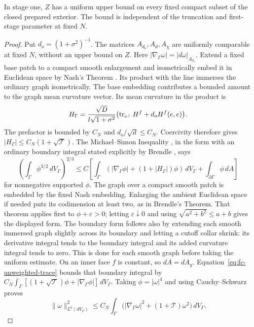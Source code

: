 \begin{lemma}
\label{lem:fc-graph-iteration}
In stage one, $Z$ has a uniform upper bound on every fixed compact
subset of the closed prepared exterior.  The bound is independent
of the truncation and first-stage parameter at fixed $N$.
\end{lemma}

\begin{proof}
Put $d_o=(1+\sigma^2)^{-1}$.  The matrices $A_{d_o},A_d,A_\chi$
are uniformly comparable at fixed $N$, without an upper bound on
$Z$.  Here $|\nabla_\Gamma\omega|=|d\omega|_{A_{d_o}}$.
Extend a fixed base patch to a compact smooth enlargement and
isometrically embed it in Euclidean space by Nash's Theorem
\cite{nash1956}.  Its product with the line immerses the ordinary
graph isometrically.  The base embedding contributes a bounded
amount to the graph mean curvature vector.  Its mean curvature
in the product is
\[
 H_\Gamma=
 \frac{\sqrt D}{l\sqrt{1+\sigma^2}}
       \bigl(\operatorname{tr}_{e^\perp}H^f+d_o H^f(e,e)\bigr).
\]
The prefactor is bounded by $C_N$ and
$d_o/\sqrt d\le C_N$.  Coercivity therefore gives
$|H_\Gamma|\le C_N(1+\sqrt{\mathcal T})$.
The Michael--Simon Inequality \cite{michaelsimon1973}, in the form
with an ordinary boundary integral stated explicitly by Brendle
\cite[Theorem~1]{brendle2021}, says
\[
 \left(\int_\Gamma\phi^{3/2}\,dV_\Gamma\right)^{2/3}
 \le C\left[
   \int_\Gamma(|\nabla_\Gamma\phi|+(1+|H_\Gamma|)\phi)\,dV_\Gamma
                     +\int_{\partial\Gamma}\phi\,dA\right]
\]
for nonnegative supported $\phi$. The graph over a compact smooth
patch is embedded by the fixed Nash embedding. Enlarging the ambient
Euclidean space if needed puts its codimension at least two, as in
Brendle's Theorem. That theorem applies first to $\phi+\varepsilon>0$;
letting $\varepsilon\downarrow0$ and using
$\sqrt{a^2+b^2}\le a+b$ gives the displayed form.
The boundary form follows
also by extending each smooth immersed graph slightly across its
boundary and letting a cutoff collar shrink: its derivative
integral tends to the boundary integral and its added curvature
integral tends to zero.  This is done for each smooth graph
before taking the uniform estimate.  On an inner face $f$ is
constant, so $dA=dA_g$.
Equation~\eqref{eq:fc-unweighted-trace} bounds that boundary
integral by
$C_N\int_\Gamma[(1+\sqrt{\mathcal T})\phi+
|\nabla_\Gamma\phi|]\,dV_\Gamma$.
Taking $\phi=|\omega|^4$ and using Cauchy--Schwarz proves
\begin{equation}\label{eq:fc-graph-sobolev}
 \|\omega\|_{L^6(dV_\Gamma)}^2
 \le C_N\int_\Gamma
       \bigl(|\nabla_\Gamma\omega|^2+
                             (1+\mathcal T)\omega^2\bigr)\,dV_\Gamma.
\end{equation}


\end{proof}
